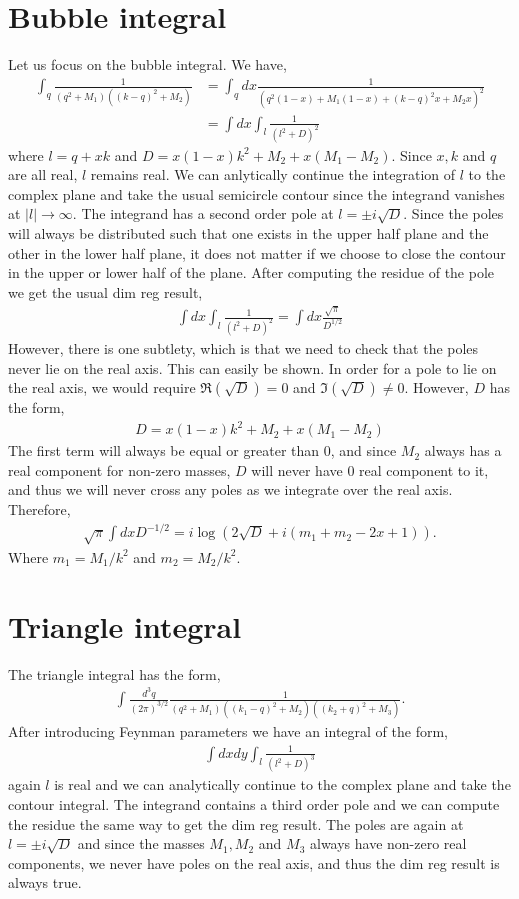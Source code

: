 \documentclass[twoside]{article}
\begin{document}
\section{Bubble integral}
Let us focus on the bubble integral. We have,
\begin{align}
  \int_{q} \frac{1}{(q^2 + M_1)( (k-q)^2 + M_2)} &=  \int_{q}dx\frac{1}{(q^2(1-x) + M_1(1-x) + (k-q)^2x + M_2x)^2}\\
  &= \int dx \int_{l}\frac{1}{(l^2 + D)^2}
\end{align}
where $l = q + xk$ and $D = x(1-x)k^2 + M_2 + x(M_1-M_2)$. Since $x,k$ and $q$ are all real, $l$ remains real. We can anlytically continue
the integration of $l$ to the complex plane and take the usual semicircle contour since the integrand vanishes at $\lvert l \rvert
\rightarrow \infty$. The integrand has a second order pole at $l = \pm i\sqrt{D}$. Since the poles will always be distributed
such that one exists in the upper half plane and the other in the lower half plane, it does not matter if we choose to close the contour in
the upper or lower half of the plane. After computing the residue of the pole we get the usual dim reg result,
\begin{align}
  \int dx \int_{l} \frac{1}{(l^2 + D)^2} = \int dx \frac{\sqrt{\pi}}{D^{1/2}}
\end{align}
However, there is one subtlety, which is that we need to check that the poles never lie on the real axis. This can easily be shown.
In order for a pole to lie on the real axis, we would require $\Re(\sqrt{D}) = 0$ and $\Im(\sqrt{D})\neq 0$. However, $D$ has the form,
\begin{align}
  D = x(1-x)k^2 + M_2 + x(M_1 - M_2)
\end{align}
The first term will always be equal or greater than 0, and since $M_2$ always has a real component for non-zero masses, $D$ will never have
0 real component to it, and thus we will never cross any poles as we integrate over the real axis. Therefore,
\begin{align}
  \sqrt{\pi}\int dx D^{-1/2} = i\log\left( 2\sqrt{D} + i(m_1 + m_2 - 2x + 1) \right).
\end{align}
Where $m_1 = M_1/k^2$ and $m_2 = M_2/k^2$. 

\section{Triangle integral}
The triangle integral has the form,
\begin{align}
  \int \frac{d^3q}{(2\pi)^{3/2}}\frac{1}{(q^2 + M_1)( (k_1 - q)^2 + M_2)( (k_2 + q)^2 + M_3)}.
\end{align}
After introducing Feynman parameters we have an integral of the form,
\begin{align}
  \int dx dy \int_l \frac{1}{(l^2 + D)^3}
\end{align}
again $l$ is real and we can analytically continue to the complex plane and take the contour integral. The integrand contains a third order
pole and we can compute the residue the same way to get the dim reg result. The poles are again at $l = \pm i \sqrt{D}$ and since the masses
$M_1, M_2$ and $M_3$ always have non-zero real components, we never have poles on the real axis, and thus the dim reg result is always true. 
\end{document}
